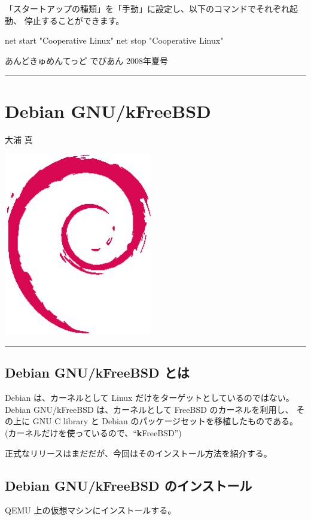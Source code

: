 \documentclass[mingoth,a4paper]{jsarticle}
\renewcommand{\dancersection}[2]{%
\newpage
あんどきゅめんてっど でびあん 2008年夏号
%
\vspace{0.1mm}\\
{\color{dancerlightblue}\rule{\hsize}{2mm}}

%
%
\begin{minipage}[t]{0.6\hsize}
\color{dancerdarkblue}
\vspace{1cm}
\section{#1}
\hfill{}#2\\
\end{minipage}
\begin{minipage}[t]{0.4\hsize}
\vspace{-2cm}
\hfill{}\includegraphics[height=8cm]{image200502/openlogo-nd.eps}\\
\vspace{-5cm}
\end{minipage}
%
%
{\color{dancerdarkblue}\rule{0.74\hsize}{2mm}}
%
\vspace{2cm}
}
\begin{document}
「スタートアップの種類」を「手動」に設定し、以下のコマンドでそれぞれ起動、
停止することができます。
\begin{commandline}
net start "Cooperative Linux"
net stop "Cooperative Linux"
\end{commandline}

\dancersection{Debian GNU/kFreeBSD}{大浦 真}

\subsection{Debian GNU/kFreeBSD とは}

Debian は、カーネルとして Linux だけをターゲットとしているのではない。
Debian GNU/kFreeBSD は、カーネルとして FreeBSD のカーネルを利用し、
その上に GNU C library と Debian のパッケージセットを移植したものである。
(カーネルだけを使っているので、``\textbf{k}FreeBSD'')

正式なリリースはまだだが、今回はそのインストール方法を紹介する。

\subsection{Debian GNU/kFreeBSD のインストール}

QEMU 上の仮想マシンにインストールする。
\end{document}
